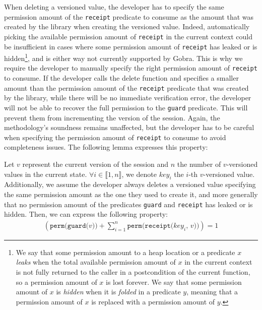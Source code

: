 When deleting a versioned value, the developer has to specify the same permission amount of the \texttt{receipt} predicate to consume as the amount that was created by the library when creating the versioned value.
Indeed, automatically picking the available permission amount of \texttt{receipt} in the current context could be insufficient in cases where some permission amount of \texttt{receipt} has leaked or is hidden\footnote{We say that some permission amount to a heap location or a predicate $x$ \emph{leaks} when the total available permission amount of $x$ in the current context is not fully returned to the caller in a postcondition of the current function, so a permission amount of $x$ is lost forever. We say that some permission amount of $x$ is \emph{hidden} when it is \emph{folded} in a predicate $y$, meaning that a permission amount of $x$ is replaced with a permission amount of $y$.}, and is either way not currently supported by Gobra.
This is why we require the developer to manually specify the right permission amount of \texttt{receipt} to consume.
If the developer calls the delete function and specifies a smaller amount than the permission amount of the \texttt{receipt} predicate that was created by the library, while there will be no immediate verification error, the developer will not be able to recover the full permission to the \texttt{guard} predicate.
This will prevent them from incrementing the version of the session.
Again, the methodology's soundness remains unaffected, but the developer has to be careful when specifying the permission amount of \texttt{receipt} to consume to avoid completeness issues.
The following lemma expresses this property:

\begin{lemma}\label{lem:sum-perm-eq-1}

    Let $v$ represent the current version of the session and $n$ the number of $v$-versioned values in the current state. $\forall i \in \llbracket 1, n \rrbracket$, we denote $key_i$ the $i$-th $v$-versioned value.
    Additionally, we assume the developer always deletes a versioned value specifying the same permission amount as the one they used to create it, and more generally that no permission amount of the predicates \texttt{guard} and \texttt{receipt} has leaked or is hidden.
    Then, we can express the following property:
    \begin{align*}
        \left(\texttt{perm(guard($v$))} + \sum_{i=1}^n \texttt{perm(receipt($key_i$, $v$))}\right) = 1
    \end{align*}

\end{lemma}

